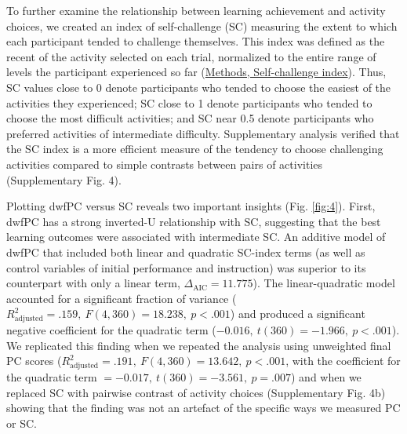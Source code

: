     To further examine the relationship between learning achievement and activity choices, we created an index of self-challenge (SC) measuring the extent to which each participant tended to challenge themselves. This index was defined as the recent {\PC} of the activity selected on each trial, normalized to the entire range of {\PC} levels the participant experienced so far (\hyperref[subsubsec:methods/analysis/sc]{Methods, Self-challenge index}). Thus, SC values close to 0 denote participants who tended to choose the easiest of the activities they experienced; SC close to 1 denote participants who tended to choose the most difficult activities; and SC near 0.5 denote participants who preferred activities of intermediate difficulty. Supplementary analysis verified that the SC index is a more efficient measure of the tendency to choose challenging activities compared to simple contrasts between pairs of activities (Supplementary Fig. 4). 
    
    Plotting dwfPC versus SC reveals two important insights (Fig. \ref{fig:4}). First, dwfPC has a strong inverted-U relationship with SC, suggesting that the best learning outcomes were associated with intermediate SC. An additive model of dwfPC that included both linear and quadratic SC-index terms (as well as control variables of initial performance and instruction) was superior to its counterpart with only a linear term, $\Delta_{\text{AIC}} = 11.775$). The linear-quadratic model accounted for a significant fraction of variance ($R_{\text{adjusted}}^2 = .159,\ F(4,360) = 18.238,\ p < .001$) and produced a significant negative coefficient for the quadratic term ($-0.016,\ t(360) = -1.966,\ p < .001$). We replicated this finding when we repeated the analysis using unweighted final PC scores  ($R_{\text{adjusted}}^2 = .191,\ F(4,360) = 13.642,\ p < .001$, with the coefficient for the quadratic term $=-0.017,\ t(360) = -3.561,\ p = .007$) and when we replaced SC with pairwise contrast of activity choices (Supplementary Fig. 4b) showing that the finding was not an artefact of the specific ways we measured PC or SC.
    
